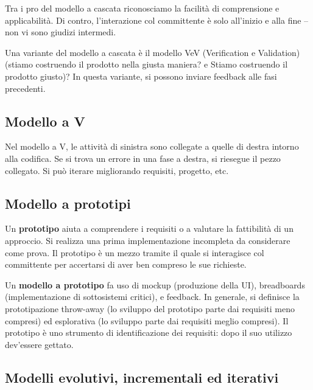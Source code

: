 \documentclass{article}
\begin{document}
        Tra i pro del modello a cascata riconosciamo la facilità di comprensione e applicabilità. Di contro, l’interazione col committente è solo all’inizio e alla fine – non vi sono giudizi intermedi.
        
        \vspace{3mm}
        
        Una variante del modello a cascata è il modello VeV (Verification e Validation) (stiamo costruendo il prodotto nella giusta maniera? e Stiamo costruendo il prodotto giusto)? In questa variante, si possono inviare feedback alle fasi precedenti.
    
    \subsection{Modello a V}
    
        Nel modello a V, le attività di sinistra sono collegate a quelle di destra intorno alla codifica. Se si trova un errore in una fase a destra, si riesegue il pezzo collegato. Si può iterare migliorando requisiti, progetto, etc.
     
    \subsection{Modello a prototipi}
     
        Un \textbf{prototipo} aiuta a comprendere i requisiti o a valutare la fattibilità di un approccio. Si realizza una prima implementazione incompleta da considerare come prova. Il prototipo è un mezzo tramite il quale si interagisce col committente per accertarsi di aver ben compreso le sue richieste. 
        
        \vspace{3mm}
        
        Un \textbf{modello a prototipo} fa uso di mockup (produzione della UI), breadboards (implementazione di sottosistemi critici), e feedback. In generale, si definisce la prototipazione throw-away (lo sviluppo del prototipo parte dai requisiti meno compresi) ed esplorativa (lo sviluppo parte dai requisiti meglio compresi). Il prototipo è uno strumento di identificazione dei requisiti: dopo il suo utilizzo dev’essere gettato.
    
    \subsection{Modelli evolutivi, incrementali ed iterativi}
    
\end{document}
